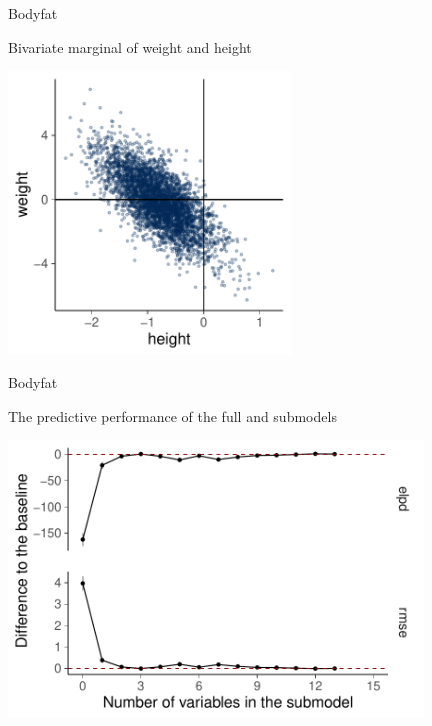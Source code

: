 \documentclass[t]{beamer}
\begin{document}
\begin{frame}{Bodyfat}

  Bivariate marginal of weight and height
  
  \includegraphics[width=7.5cm]{bodyfat_mcmc_scatter.pdf}

\end{frame}

\begin{frame}{Bodyfat}

  The predictive performance of the full and submodels
  
  \includegraphics[width=11cm]{bodyfat_varsel_plot.pdf}

\end{frame}
\end{document}
